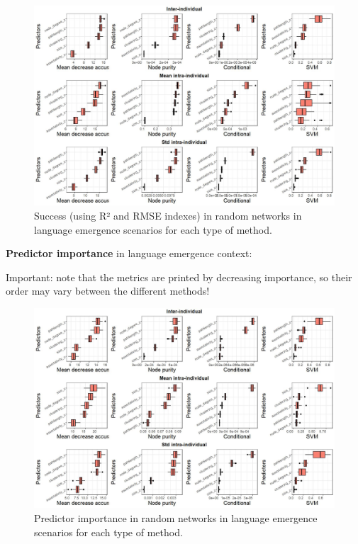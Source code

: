 \documentclass[
]{article}
\begin{document}
\begin{figure}[!H]

{\centering \includegraphics{./Figures/unnamed-chunk-94-1} 

}

\caption{Success (using R² and RMSE indexes) in random networks in language emergence scenarios for each type of method.}\label{fig:unnamed-chunk-94}
\end{figure}

\textbf{Predictor importance} in language emergence context:

Important: note that the metrics are printed by decreasing importance,
so their order may vary between the different methods!

\begin{figure}[!H]

{\centering \includegraphics{./Figures/unnamed-chunk-95-1} 

}

\caption{Predictor importance in random networks in language emergence scenarios for each type of method.}\label{fig:unnamed-chunk-95}
\end{figure}
\end{document}

